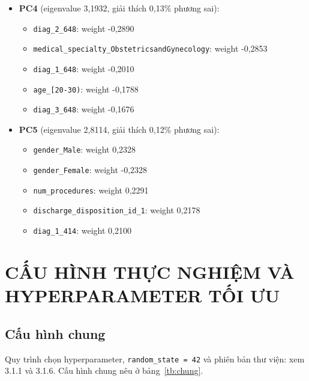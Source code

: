 \documentclass[a4paper]{report}
\begin{document}
\begin{itemize}
  \item \textbf{PC4} (eigenvalue 3,1932, giải thích 0,13\% phương sai):

\begin{itemize}
  \item \texttt{diag\_\allowbreak{}2\_\allowbreak{}648}: weight -0,2890
  \item \texttt{medical\_\allowbreak{}specialty\_\allowbreak{}ObstetricsandGynecology}: weight -0,2853
  \item \texttt{diag\_\allowbreak{}1\_\allowbreak{}648}: weight -0,2010
  \item \texttt{age\_\allowbreak{}[20-30)}: weight -0,1788
  \item \texttt{diag\_\allowbreak{}3\_\allowbreak{}648}: weight -0,1676
\end{itemize}

  \item \textbf{PC5} (eigenvalue 2,8114, giải thích 0,12\% phương sai):

\begin{itemize}
  \item \texttt{gender\_\allowbreak{}Male}: weight 0,2328
  \item \texttt{gender\_\allowbreak{}Female}: weight -0,2328
  \item \texttt{num\_\allowbreak{}procedures}: weight 0,2291
  \item \texttt{discharge\_\allowbreak{}disposition\_\allowbreak{}id\_\allowbreak{}1}: weight 0,2178
  \item \texttt{diag\_\allowbreak{}1\_\allowbreak{}414}: weight 0,2100
\end{itemize}
\end{itemize}

\section{CẤU HÌNH THỰC NGHIỆM VÀ HYPERPARAMETER TỐI ƯU}

\subsection{Cấu hình chung}

Quy trình chọn hyperparameter, \texttt{random\_\allowbreak{}state = 42} và phiên bản thư viện: xem 3.1.1 và 3.1.6. Cấu hình chung nêu ở bảng~\ref{tb:chung}.
\end{document}
